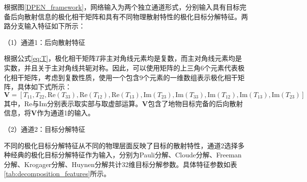 根据图\ref{DPEN_framework}，网络输入为两个独立通道形式，分别输入具有目标完备后向散射信息的极化相干矩阵和具有不同物理散射特性的极化目标分解特征。两路分支输入特征如下所示：

（1）通道1：后向散射特征

根据公式\ref{eq:T}，极化相干矩阵$T$非主对角线元素均是复数，而主对角线元素均是实数，并且关于主对角线共轭对称。因此，可以使用矩阵的上三角6个元素代表极化相干矩阵，考虑到复数性质，使用一个包含9个元素的一维数组表示极化相干矩阵，具体如下式所示：
\begin{equation}
    \mathbf{V}=[T_{11}, T_{22}, \text{Re}(T_{33}), \text{Re}(T_{12}), \text{Re}(T_{13}), \text{Im}(T_{23}), \text{Im}(T_{33}), \text{Im}(T_{12}), \text{Im}(T_{13}), \text{Im}(T_{23})]
\end{equation}
其中，$\text{Re}$与$\text{Im}$分别表示取实部与取虚部运算。$\mathbf{V}$包含了地物目标完备的后向散射信息，将$\mathbf{V}$作为通道1的输入。

（2）通道2：目标分解特征

不同的极化目标分解特征从不同的物理层面反映了目标的散射特性，通道2选择多种经典的极化目标分解特征作为输入，分别为Pauli分解、Cloude分解、Freeman分解、Krogager分解、Huynen分解共计32维目标分解参数。具体特征参数如表\ref{tab:decomposition_features}所示。

